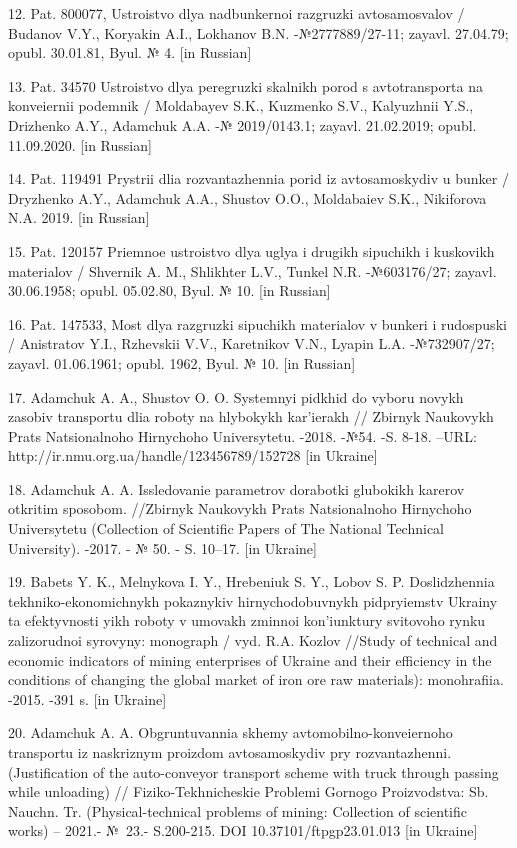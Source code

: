 \begin{noparindent}
12. Pat. 800077, Ustroistvo dlya nadbunkernoi razgruzki avtosamosvalov /
Budanov V.Y., Koryakin A.I., Lokhanov B.N. -№2777889/27-11; zayavl.
27.04.79; opubl. 30.01.81, Byul. № 4. {[}in Russian{]}

13. Pat. 34570 Ustroistvo dlya peregruzki skalnikh porod s
avtotransporta na konveiernii podemnik / Moldabayev S.K., Kuzmenko S.V.,
Kalyuzhnii Y.S., Drizhenko A.Y., Adamchuk A.A. -№ 2019/0143.1; zayavl.
21.02.2019; opubl. 11.09.2020. {[}in Russian{]}

14. Pat. 119491 Prystrii dlia rozvantazhennia porid iz avtosamoskydiv u
bunker / Dryzhenko A.Y., Adamchuk A.A., Shustov O.O., Moldabaiev S.K.,
Nikiforova N.A. 2019. {[}in Russian{]}

15. Pat. 120157 Priemnoe ustroistvo dlya uglya i drugikh sipuchikh i
kuskovikh materialov / Shvernik A. M., Shlikhter L.V., Tunkel N.R.
-№603176/27; zayavl. 30.06.1958; opubl. 05.02.80, Byul. № 10. {[}in
Russian{]}

16. Pat. 147533, Most dlya razgruzki sipuchikh materialov v bunkeri i
rudospuski / Anistratov Y.I., Rzhevskii V.V., Karetnikov V.N., Lyapin
L.A. -№732907/27; zayavl. 01.06.1961; opubl. 1962, Byul. № 10. {[}in
Russian{]}

17. Adamchuk A. A., Shustov O. O. Systemnyi pidkhid do vyboru novykh
zasobiv transportu dlia roboty na hlybokykh kar'ierakh // Zbirnyk
Naukovykh Prats Natsionalnoho Hirnychoho Universytetu. -2018. -№54. -S.
8-18. --URL: http://ir.nmu.org.ua/handle/123456789/152728 {[}in
Ukraine{]}

18. Adamchuk A. A. Issledovanie parametrov dorabotki glubokikh karerov
otkritim sposobom. //Zbirnyk Naukovykh Prats Natsionalnoho Hirnychoho
Universytetu (Collection of Scientific Papers of The National Technical
University). -2017. - № 50. - S. 10--17. {[}in Ukraine{]}

19. Babets Y. K., Melnykova I. Y., Hrebeniuk S. Y., Lobov S. P.
Doslidzhennia tekhniko-ekonomichnykh pokaznykiv hirnychodobuvnykh
pidpryiemstv Ukrainy ta efektyvnosti yikh roboty v umovakh zminnoi
kon'iunktury svitovoho rynku zalizorudnoi syrovyny: monograph / vyd.
R.A. Kozlov //Study of technical and economic indicators of mining
enterprises of Ukraine and their efficiency in the conditions of
changing the global market of iron ore raw materials): monohrafiia.
-2015. -391 s. {[}in Ukraine{]}

20. Adamchuk A. A. Obgruntuvannia skhemy avtomobilno-konveiernoho
transportu iz naskriznym proizdom avtosamoskydiv pry rozvantazhenni.
(Justification of the auto-conveyor transport scheme with truck through
passing while unloading) // Fiziko-Tekhnicheskie Problemi Gornogo
Proizvodstva: Sb. Nauchn. Tr. (Physical-technical problems of mining:
Collection of scientific works) -- 2021.- №~23.- S.200-215. DOI
10.37101/ftpgp23.01.013 {[}in Ukraine{]}
\end{noparindent}

